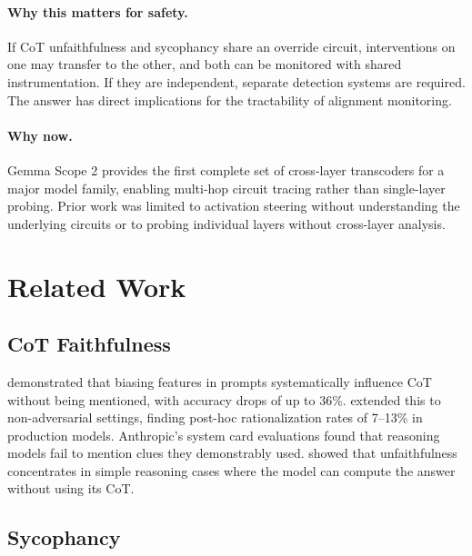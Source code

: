 \documentclass[11pt]{article}
\begin{document}
\paragraph{Why this matters for safety.} If CoT unfaithfulness and sycophancy share an override circuit, interventions on one may transfer to the other, and both can be monitored with shared instrumentation. If they are independent, separate detection systems are required. The answer has direct implications for the tractability of alignment monitoring.

\paragraph{Why now.} Gemma Scope 2 \citep{gemmascope2025} provides the first complete set of cross-layer transcoders for a major model family, enabling multi-hop circuit tracing rather than single-layer probing. Prior work was limited to activation steering without understanding the underlying circuits \citep{rimsky2024steering} or to probing individual layers without cross-layer analysis.

\section{Related Work}
\label{sec:related}

\subsection{CoT Faithfulness}

\citet{turpin2023language} demonstrated that biasing features in prompts systematically influence CoT without being mentioned, with accuracy drops of up to 36\%. \citet{arcuschin2025cot} extended this to non-adversarial settings, finding post-hoc rationalization rates of 7--13\% in production models. Anthropic's system card evaluations \citep{anthropic2025reasoning} found that reasoning models fail to mention clues they demonstrably used. \citet{metr2025cot} showed that unfaithfulness concentrates in simple reasoning cases where the model can compute the answer without using its CoT.

\subsection{Sycophancy}
\end{document}
